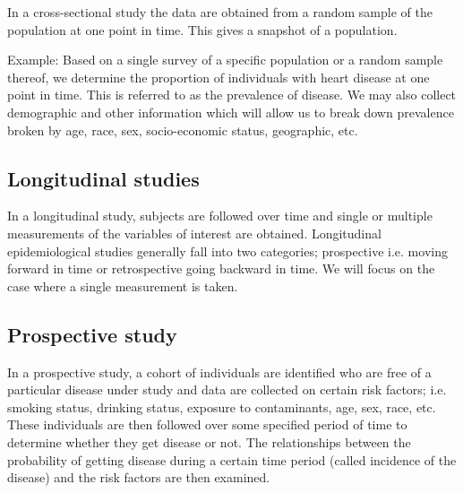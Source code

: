 In a cross-sectional study the data are obtained from a random sample of the population at one
point in time. This gives a snapshot of a population.

Example: Based on a single survey of a speciﬁc population or a random sample thereof, we
determine the proportion of individuals with heart disease at one point in time. This is referred to
as the prevalence of disease. We may also collect demographic and other information which will
allow us to break down prevalence broken by age, race, sex, socio-economic status, geographic,
etc.

\subsection{Longitudinal studies}

In a longitudinal study, subjects are followed over time and single or multiple measurements of
the variables of interest are obtained. Longitudinal epidemiological studies generally fall into
two categories; prospective i.e. moving forward in time or retrospective going backward in
time. We will focus on the case where a single measurement is taken.

\subsection{Prospective study} In a prospective study, a cohort of individuals are identiﬁed who are free
of a particular disease under study and data are collected on certain risk factors; i.e. smoking
status, drinking status, exposure to contaminants, age, sex, race, etc. These individuals are
then followed over some speciﬁed period of time to determine whether they get disease or not.
The relationships between the probability of getting disease during a certain time period (called
incidence of the disease) and the risk factors are then examined.


